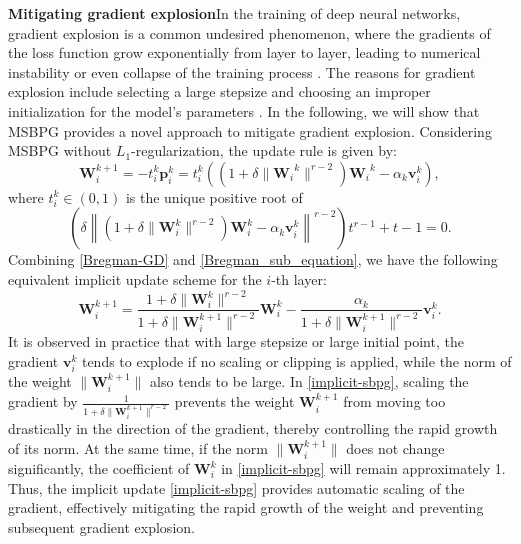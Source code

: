 \documentclass[twoside,11pt]{article}
\newcommand{\be}{\begin{equation}}
\newcommand{\ee}{\end{equation}}
\def\vg{{\bm{g}}}
\def\vp{{\bm{p}}}
\def\vv{{\bm{v}}}
\def\mW{{\bm{W}}}
\begin{document}


\vspace{1em}

\noindent\textbf{Mitigating gradient explosion}\quad In the training of deep neural networks, gradient explosion is a common undesired phenomenon, where the gradients of the loss function grow exponentially from layer to layer, leading to numerical instability or even collapse of the training process \citep{hochreiter1991untersuchungen,manchev2020target}. The reasons for gradient explosion include selecting a large stepsize and choosing an improper initialization for the model's parameters \citep{pascanu2013difficulty}. In the following, we will show that MSBPG  provides a novel approach to mitigate gradient explosion. Considering MSBPG  without $L_1$-regularization, the update rule is given by:
\be
{\mW}_i^{k+1}=-t_i^k\vp_i^k=t_i^k\left((1+\delta\|{\mW_i}^k\|^{r-2}){\mW_i}^k-\alpha_k\vv_i^k\right),
\label{Bregman-GD}
\ee
where $t_i^k\in(0,1)$ is the unique positive root of 
\be 
\left(\delta\left\|(1+\delta\|{\mW}_i^k\|^{r-2}){\mW}_i^k-\alpha_k\vv_i^k\right\|^{r-2}\right)t^{r-1}+t-1=0.
\label{Bregman_sub_equation}
\ee
Combining \eqref{Bregman-GD} and \eqref{Bregman_sub_equation}, we have the following equivalent implicit update scheme for the $i$-th layer:
\be
\mW_i^{k+1}=\frac{1+\delta\|\mW_i^k\|^{r-2}}{1+\delta\|\mW_i^{k+1}\|^{r-2}}\mW_i^k-\frac{\alpha_k}{1+\delta\|\mW_i^{k+1}\|^{r-2}}\vv_i^k.
\label{implicit-sbpg}
\ee
It is observed in practice that with large stepsize or large initial point, the gradient $\vv_i^k$ tends to explode if no scaling or clipping is applied, while the norm of the weight $\|\mW_i^{k+1}\|$ also tends to be large. In \eqref{implicit-sbpg}, scaling the gradient by $\frac{1}{1+\delta\|\mW_i^{k+1}\|^{r-2}}$ prevents the weight $\mW_i^{k+1}$ from moving too drastically in the direction of the gradient, thereby controlling the rapid growth of its norm. At the same time, if the norm  $\|\mW_i^{k+1}\|$ does not change significantly, the coefficient of $\mW_i^k$ in \eqref{implicit-sbpg} will remain approximately 1. Thus, the implicit update \eqref{implicit-sbpg} provides automatic scaling of the gradient, effectively mitigating the rapid growth of the weight and preventing subsequent gradient explosion.
\end{document}

